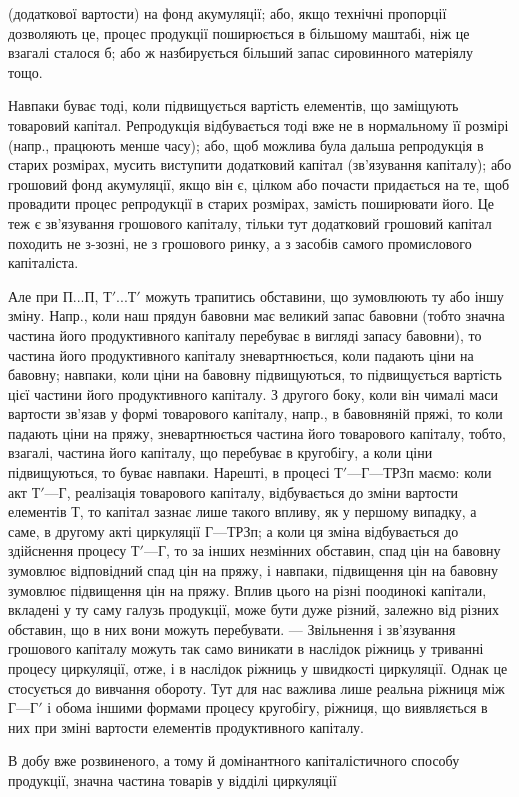 \parcont{}  %
(додаткової вартости) на фонд акумуляції; або, якщо технічні пропорції
дозволяють це, процес продукції поширюється в більшому маштабі,
ніж це взагалі сталося б; або ж назбирується більший запас сировинного
матеріялу тощо.

Навпаки буває тоді, коли підвищується вартість елементів, що заміщують
товаровий капітал. Репродукція відбувається тоді вже не в нормальному
її розмірі (напр., працюють менше часу); або, щоб можлива
була дальша репродукція в старих розмірах, мусить виступити додатковий
капітал (зв’язування капіталу); або грошовий фонд акумуляції, якщо він
є, цілком або почасти придається на те, щоб провадити процес репродукції
в старих розмірах, замість поширювати його. Це теж є зв’язування
грошового капіталу, тільки тут додатковий грошовий капітал походить
не з-зозні, не з грошового ринку, а з засобів самого промислового
капіталіста.

Але при $П... П$, $Т'... Т'$ можуть трапитись обставини, що зумовлюють
ту або іншу зміну. Напр., коли наш прядун бавовни має великий
запас бавовни (тобто значна частина його продуктивного капіталу
перебуває в вигляді запасу бавовни), то частина його продуктивного
капіталу зневартнюється, коли падають ціни на бавовну; навпаки, коли ціни
на бавовну підвищуються, то підвищується вартість цієї частини його
продуктивного капіталу. З другого боку, коли він чималі маси вартости
зв’язав у формі товарового капіталу, напр., в бавовняній пряжі, то коли
падають ціни на пряжу, зневартнюється частина його товарового капіталу,
тобто, взагалі, частина його капіталу, що перебуває в кругобігу, а коли
ціни підвищуються, то буває навпаки. Нарешті, в процесі $Т' — Г — Т Р Зп$
маємо: коли акт $Т' — Г$, реалізація товарового капіталу, відбувається до
зміни вартости елементів Т, то капітал зазнає лише такого впливу, як у першому
випадку, а саме, в другому акті циркуляції $Г — Т Р Зп$; а коли
ця зміна відбувається до здійснення процесу $Т' — Г$, то за інших незмінних
обставин, спад цін на бавовну зумовлює відповідний спад цін на пряжу,
і навпаки, підвищення цін на бавовну зумовлює підвищення цін на пряжу.
Вплив цього на різні поодинокі капітали, вкладені у ту саму галузь
продукції, може бути дуже різний, залежно від різних обставин, що в них
вони можуть перебувати. — Звільнення і зв’язування грошового капіталу
можуть так само виникати в наслідок ріжниць у триванні процесу циркуляції,
отже, і в наслідок ріжниць у швидкості циркуляції. Однак це
стосується до вивчання обороту. Тут для нас важлива лише реальна
ріжниця між $Г — Г'$ і обома іншими формами процесу кругобігу,
ріжниця, що виявляється в них при зміні вартости елементів продуктивного
капіталу.

В добу вже розвиненого, а тому й домінантного капіталістичного
способу продукції, значна частина товарів у відділі циркуляції
\parbreak{}  %
